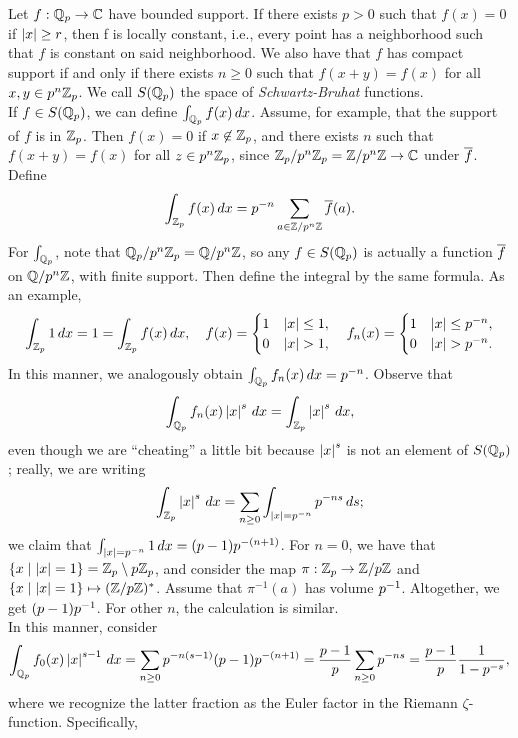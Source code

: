 \noindent Let $f : \mathbb Q_p \to \mathbb C$ have bounded support. If there exists $p > 0$ such that $f(x) = 0$ if $\left\lvert x \right\rvert \geq r$, then f is locally constant, i.e., every point has a neighborhood such that $f$ is constant on said neighborhood. We also have that $f$ has compact support if and only if there exists $n \geq 0$ such that $f(x + y) = f(x)$ for all $x, y \in p^n \mathbb Z_p$. We call $S(\mathbb Q_p)$ the space of \textit{Schwartz-Bruhat} functions.
\\[8pt]
If $f \in S(\mathbb Q_p)$, we can define $\int_{\mathbb Q_p} f(x) \, dx$. Assume, for example, that the support of $f$ is in $\mathbb Z_p$. Then $f(x) = 0$ if $x \not\in \mathbb Z_p$, and there exists $n$ such that $f(x + y) = f(x)$ for all $z \in p^n \mathbb Z_p$, since $\mathbb Z_p/p^n\mathbb Z_p = \mathbb Z/p^n\mathbb Z \to \mathbb C$ under $\overline f$. Define
\[ \int_{\mathbb Z_p} f(x) \, dx = p^{-n} \sum_{a \in \mathbb Z/p^n\mathbb Z} \overline f(a). \]
For $\int_{\mathbb Q_p}$, note that $\mathbb Q_p/p^n \mathbb Z_p = \mathbb Q/p^n\mathbb Z$, so any $f \in S(\mathbb Q_p)$ is actually a function $\overline f$ on $\mathbb Q/p^n\mathbb Z$, with finite support. Then define the integral by the same formula. As an example,
\[ \int_{\mathbb Z_p} 1 \, dx = 1 = \int_{\mathbb Z_p} f(x) \, dx, \quad f(x) = \begin{cases} 1 & \left\lvert x \right\rvert \leq 1, \\ 0 & \left\lvert x \right\rvert > 1, \end{cases} \quad f_n(x) = \begin{cases} 1 & \left\lvert x \right\rvert \leq p^{-n}, \\ 0 & \left\lvert x \right\rvert > p^{-n}. \end{cases} \]
In this manner, we analogously obtain $\int_{\mathbb Q_p} f_n(x) \, dx = p^{-n}$. Observe that
\[ \int_{\mathbb Q_p} f_n(x) \left\lvert x \right\rvert^s \, dx = \int_{\mathbb Z_p} \left\lvert x \right\rvert^s \, dx, \]
even though we are ``cheating'' a little bit because $\left\lvert x \right\rvert^s$ is not an element of $S(\mathbb Q_p)$; really, we are writing
\[ \int_{\mathbb Z_p} \left\lvert x \right\rvert^s \, dx = \sum_{n \geq 0} \int_{\left\lvert x \right\rvert = p^{-n}} p^{-ns} \, ds; \]
we claim that $\int_{\left\lvert x \right\rvert = p^{-n}} 1 \, dx = (p-1) p^{-(n+1)}$. For $n = 0$, we have that $\{x \mid \left\lvert x \right\rvert = 1\} = \mathbb Z_p \setminus p \mathbb Z_p$, and consider the map $\pi : \mathbb Z_p \to \mathbb Z/p\mathbb Z$ and $\{x \mid \left\lvert x \right\rvert = 1\} \mapsto (\mathbb Z/p\mathbb Z)^\ast$. Assume that $\pi^{-1}(a)$ has volume $p^{-1}$. Altogether, we get $(p-1) p^{-1}$. For other $n$, the calculation is similar.
\\[8pt]
In this manner, consider
\[ \int_{\mathbb Q_p} f_0(x) \left\lvert x \right\rvert^{s-1} \, dx = \sum_{n \geq 0} p^{-n(s-1)} (p-1) p^{-(n+1)} = \frac{p-1}{p} \sum_{n \geq 0} p^{-ns} = \frac{p-1}{p} \frac{1}{1 - p^{-s}}, \]
where we recognize the latter fraction as the Euler factor in the Riemann $\zeta$-function. Specifically,
